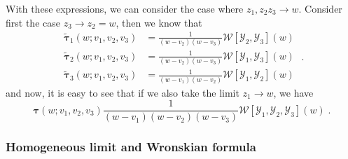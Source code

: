 \documentclass[a4paper,11pt]{amsart}
\begin{document}
With these expressions, we can consider the case where \(z_1, z_2 z_3
\to w\). Consider first the case \(z_3 \to z_2 = w\), then  
we know that 
\begin{equation}
  \begin{split}
  \tilde{\bm{\tau}}_1(w; v_1 , v_2, v_3) & = \frac{1}{(w - v_2)(w - v_3)}\mathcal{W}[\mathcal{Y}_2, \mathcal{Y}_3](w)\\
  \tilde{\bm{\tau}}_2(w; v_1 , v_2, v_3) & = \frac{1}{(w - v_2)(w - v_3)}\mathcal{W}[\mathcal{Y}_1, \mathcal{Y}_3](w)\\
  \tilde{\bm{\tau}}_3(w; v_1 , v_2, v_3) & = \frac{1}{(w - v_1)(w - v_2)}\mathcal{W}[\mathcal{Y}_1, \mathcal{Y}_2](w)
  \end{split}\; .
\end{equation}
and now, it is easy to see that if we also take the limit \(z_1\to w\), we have
\begin{equation}
  \bm{\tau}(w; v_1 , v_2, v_3)
  \frac{1}{(w - v_1)(w - v_2)(w - v_3)} \mathcal{W}[\mathcal{Y}_1, \mathcal{Y}_2, \mathcal{Y}_3](w)\; .
\end{equation}

\subsubsection{Homogeneous limit and Wronskian formula}
\end{document}
